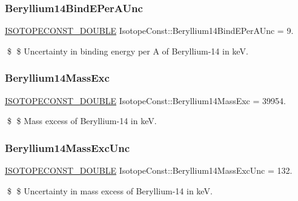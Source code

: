 \subsubsection{\texorpdfstring{Beryllium14\+Bind\+E\+Per\+A\+Unc}{Beryllium14BindEPerAUnc}}
{\footnotesize\ttfamily \mbox{\hyperlink{group___isotope_const-_macros_ga8f45a7272ce02c0b4c65c44636ed719a}{I\+S\+O\+T\+O\+P\+E\+C\+O\+N\+S\+T\+\_\+\+D\+O\+U\+B\+LE}} Isotope\+Const\+::\+Beryllium14\+Bind\+E\+Per\+A\+Unc = 9.}

\$ \$ Uncertainty in binding energy per A of Beryllium-\/14 in keV. \mbox{\label{group___isotope_const-_beryllium-_be14_ga5b0c4f1d53a16e1f67534105db64fe96}} 
\subsubsection{\texorpdfstring{Beryllium14\+Mass\+Exc}{Beryllium14MassExc}}
{\footnotesize\ttfamily \mbox{\hyperlink{group___isotope_const-_macros_ga8f45a7272ce02c0b4c65c44636ed719a}{I\+S\+O\+T\+O\+P\+E\+C\+O\+N\+S\+T\+\_\+\+D\+O\+U\+B\+LE}} Isotope\+Const\+::\+Beryllium14\+Mass\+Exc = 39954.}

\$ \$ Mass excess of Beryllium-\/14 in keV. \mbox{\label{group___isotope_const-_beryllium-_be14_ga5435d710ae4add60a87eef68ead264b8}} 
\subsubsection{\texorpdfstring{Beryllium14\+Mass\+Exc\+Unc}{Beryllium14MassExcUnc}}
{\footnotesize\ttfamily \mbox{\hyperlink{group___isotope_const-_macros_ga8f45a7272ce02c0b4c65c44636ed719a}{I\+S\+O\+T\+O\+P\+E\+C\+O\+N\+S\+T\+\_\+\+D\+O\+U\+B\+LE}} Isotope\+Const\+::\+Beryllium14\+Mass\+Exc\+Unc = 132.}

\$ \$ Uncertainty in mass excess of Beryllium-\/14 in keV. \mbox{\label{group___isotope_const-_beryllium-_be14_ga480138d58c6c1645063d7c3944cf50ba}} 
